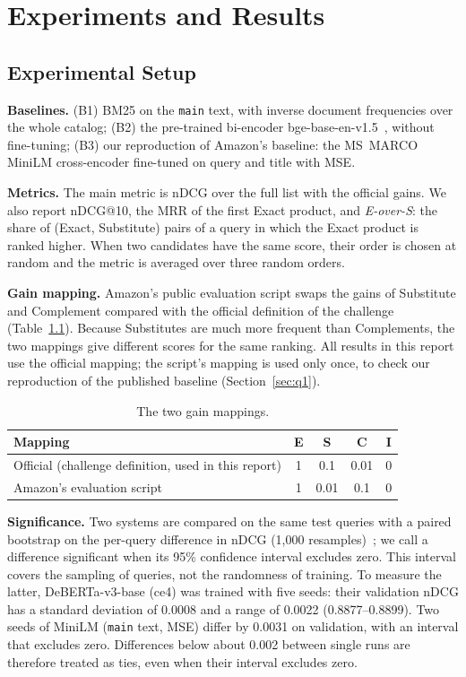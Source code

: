 \documentclass[12pt,a4paper]{report}
\begin{document}
\chapter{Experiments and Results}\label{ch:exp}
\section{Experimental Setup}
\textbf{Baselines.} (B1) BM25 on the \texttt{main} text, with inverse document frequencies over the whole catalog; (B2) the pre-trained bi-encoder bge-base-en-v1.5~\cite{bge}, without fine-tuning; (B3) our reproduction of Amazon's baseline: the MS~MARCO MiniLM cross-encoder fine-tuned on query and title with MSE.

\textbf{Metrics.} The main metric is nDCG over the full list with the official gains. We also report nDCG@10, the MRR of the first Exact product, and \emph{E-over-S}: the share of (Exact, Substitute) pairs of a query in which the Exact product is ranked higher. When two candidates have the same score, their order is chosen at random and the metric is averaged over three random orders.

\textbf{Gain mapping.} Amazon's public evaluation script swaps the gains of Substitute and Complement compared with the official definition of the challenge (Table~\ref{tab:gains}). Because Substitutes are much more frequent than Complements, the two mappings give different scores for the same ranking. All results in this report use the official mapping; the script's mapping is used only once, to check our reproduction of the published baseline (Section~\ref{sec:q1}).

\begin{table}[H]
\centering
\caption{The two gain mappings.}
\label{tab:gains}
\small
\begin{tabular}{@{}lcccc@{}}
\toprule
\textbf{Mapping} & \textbf{E} & \textbf{S} & \textbf{C} & \textbf{I} \\
\midrule
Official (challenge definition, used in this report) & 1 & 0.1 & 0.01 & 0 \\
Amazon's evaluation script & 1 & 0.01 & 0.1 & 0 \\
\bottomrule
\end{tabular}
\end{table}

\textbf{Significance.} Two systems are compared on the same test queries with a paired bootstrap on the per-query difference in nDCG (1,000 resamples)~\cite{bootstrap}; we call a difference significant when its 95\% confidence interval excludes zero. This interval covers the sampling of queries, not the randomness of training. To measure the latter, DeBERTa-v3-base (ce4) was trained with five seeds: their validation nDCG has a standard deviation of 0.0008 and a range of 0.0022 (0.8877--0.8899). Two seeds of MiniLM (\texttt{main} text, MSE) differ by 0.0031 on validation, with an interval that excludes zero. Differences below about 0.002 between single runs are therefore treated as ties, even when their interval excludes zero.
\end{document}
